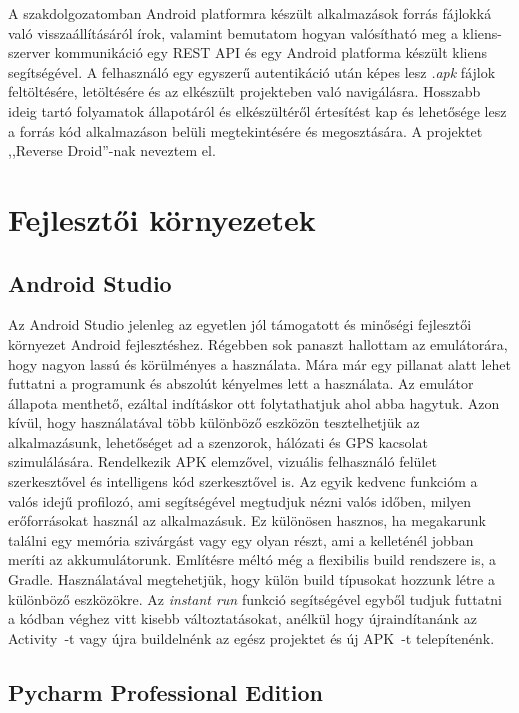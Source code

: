 \documentclass{thesis-ekf}
\theoremstyle{definition}
\theoremstyle{remark}
\begin{document}
A szakdolgozatomban Android platformra készült alkalmazások forrás fájlokká való visszaállításáról írok, valamint bemutatom hogyan valósítható meg a kliens-szerver kommunikáció egy REST API és egy Android platforma készült kliens segítségével.
A felhasználó egy egyszerű autentikáció után képes lesz \emph{.apk} fájlok feltöltésére, letöltésére és az elkészült projekteben való navigálásra.
Hosszabb ideig tartó folyamatok állapotáról és elkészültéről értesítést kap és lehetősége lesz a forrás kód alkalmazáson belüli megtekintésére és megosztására.
A projektet ,,Reverse Droid''-nak neveztem el.

\chapter{Fejlesztői környezetek}\label{kornyezetek}

\section{Android Studio}

Az Android Studio jelenleg az egyetlen jól támogatott és minőségi fejlesztői környezet Android fejlesztéshez.
Régebben sok panaszt hallottam az emulátorára, hogy nagyon lassú és körülményes a használata.
Mára már egy pillanat alatt lehet futtatni a programunk és abszolút kényelmes lett a használata.
Az emulátor állapota menthető, ezáltal indításkor ott folytathatjuk ahol abba hagytuk. Azon kívül, hogy használatával több különböző eszközön tesztelhetjük az alkalmazásunk, lehetőséget ad a szenzorok, hálózati és GPS kacsolat szimulálására. 
Rendelkezik APK elemzővel, vizuális felhasználó felület szerkesztővel és intelligens kód szerkesztővel is.
Az egyik kedvenc funkcióm a valós idejű profilozó, ami segítségével megtudjuk nézni valós időben, milyen erőforrásokat használ az alkalmazásuk.
Ez különösen hasznos, ha megakarunk találni egy memória szivárgást vagy egy olyan részt, ami a kelleténél jobban meríti az akkumulátorunk.
Említésre méltó még a flexibilis build rendszere is, a Gradle. Használatával megtehetjük, hogy külön build típusokat hozzunk létre a különböző eszközökre.
Az \emph{instant run} funkció segítségével egyből tudjuk futtatni a kódban véghez vitt kisebb változtatásokat, anélkül hogy újraindítanánk az Activity~-t vagy újra buildelnénk az egész projektet és új APK~-t telepítenénk.
\cite{androidstudio}


\section{Pycharm Professional Edition}
\end{document}
